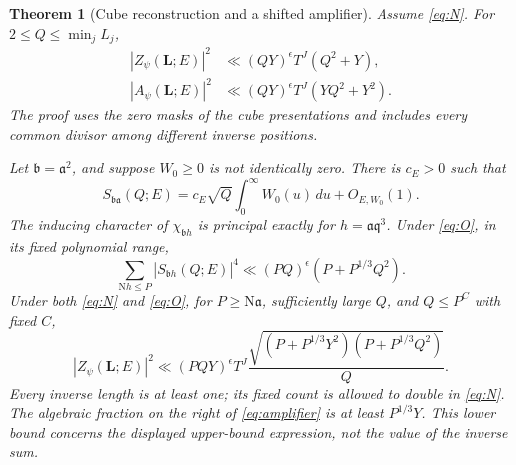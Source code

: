 \documentclass[11pt]{article}
\newtheorem{theorem}{Theorem}[section]
\theoremstyle{remark}\newtheorem{remark}[theorem]{Remark}
\newcommand{\N}{\mathrm N}
\begin{document}
\begin{theorem}[Cube reconstruction and a shifted amplifier]\label{thm:continuation}
Assume \eqref{eq:N}. For $2\le Q\le\min_jL_j$,
\begin{align}
|Z_\psi(\mathbf L;E)|^2&\ll(QY)^\epsilon T^J(Q^2+Y),\label{eq:reconstruction}\\
|A_\psi(\mathbf L;E)|^2&\ll(QY)^\epsilon T^J(YQ^2+Y^2).
\end{align}
The proof uses the zero masks of the cube presentations and includes every common divisor among different inverse positions.

Let $\mathfrak b=\mathfrak a^2$, and suppose $W_0\ge0$ is not identically zero. There is $c_E>0$ such that
\begin{equation}
S_{\mathfrak b\mathfrak a}(Q;E)
=c_E\sqrt Q\int_0^\infty W_0(u)\,du+O_{E,W_0}(1).
\end{equation}
The inducing character of $\chi_{\mathfrak b h}$ is principal exactly for $h=\mathfrak a\mathfrak q^3$. Under \eqref{eq:O}, in its fixed polynomial range,
\begin{equation}
\sum_{\N h\le P}|S_{\mathfrak b h}(Q;E)|^4
\ll(PQ)^\epsilon(P+P^{1/3}Q^2).
\end{equation}
Under both \eqref{eq:N} and \eqref{eq:O}, for $P\ge\N\mathfrak a$, sufficiently large $Q$, and $Q\le P^C$ with fixed $C$,
\begin{equation}
|Z_\psi(\mathbf L;E)|^2
\ll(PQY)^\epsilon T^J
\frac{\sqrt{(P+P^{1/3}Y^2)(P+P^{1/3}Q^2)}}{Q}.
\label{eq:amplifier}
\end{equation}
Every inverse length is at least one; its fixed count is allowed to double in \eqref{eq:N}. The algebraic fraction on the right of \eqref{eq:amplifier} is at least $P^{1/3}Y$. This lower bound concerns the displayed upper-bound expression, not the value of the inverse sum.
\end{theorem}
\end{document}
